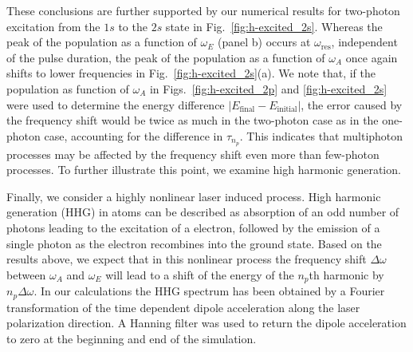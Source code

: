 These conclusions are further supported by our numerical results for two-photon excitation from the $1s$ to the $2s$ state in Fig.~\ref{fig:h-excited_2s}. Whereas the peak of the population as a function of $\omega_E$ (panel b) occurs at $\omega_\text{res}$, independent of the pulse duration, the peak of the population as a function of  $\omega_A$ once again shifts to lower frequencies in Fig.~\ref{fig:h-excited_2s}(a). We note that, if the population as function of $\omega_A$ in Figs.~\ref{fig:h-excited_2p} and \ref{fig:h-excited_2s} were used to determine the energy difference $|E_\text{final} - E_\text{initial}|$, the error caused by the frequency shift would be twice as much in the two-photon case as in the one-photon case, accounting for the difference in $\tau_{n_p}$. This indicates that multiphoton processes may be affected by the frequency shift even more than few-photon processes. To further illustrate this point, we examine high harmonic generation.


Finally, we consider a highly nonlinear laser induced process. High harmonic generation (HHG) in atoms can be described as absorption of an odd number of photons leading to the excitation of a electron, followed by the emission of a single photon as the electron recombines into the ground state. Based on the results above, we expect that in this nonlinear process the frequency shift $\Delta\omega$ between $\omega_A$ and $\omega_E$ will lead to a shift of the energy of the $n_p$th harmonic by $n_p\Delta\omega$. In our calculations the HHG spectrum has been obtained by a Fourier transformation of the time dependent dipole acceleration along the laser polarization direction. A Hanning filter was used to return the dipole acceleration to zero at the beginning and end of the simulation. 

